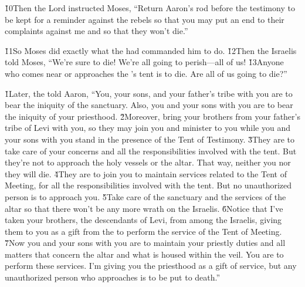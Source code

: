 \v{10}Then the Lord instructed Moses, ``Return Aaron's rod before the testimony to be kept for a reminder against the rebels so that you may put an end to their complaints against me and so that they won't die.''

\v{11}So Moses did exactly what the  had commanded him to do. \v{12}Then the Israelis told Moses, ``We're sure to die! We're all going to perish---all of us! \v{13}Anyone who comes near or approaches the 's tent is to die. Are all of us going to die?''

\v{1}Later, the  told Aaron, ``You, your sons, and your father's tribe with you are to bear the iniquity of the sanctuary. Also, you and your sons with you are to bear the iniquity of your priesthood. \v{2}Moreover, bring your brothers from your father's tribe of Levi with you, so they may join you and minister to you while you and your sons with you stand in the presence of the Tent of Testimony. \v{3}They are to take care of your concerns and all the responsibilities involved with the tent. But they're not to approach the holy vessels or the altar. That way, neither you nor they will die. \v{4}They are to join you to maintain services related to the Tent of Meeting, for all the responsibilities involved with the tent. But no unauthorized person is to approach you. \v{5}Take care of the sanctuary and the services of the altar so that there won't be any more wrath on the Israelis. \v{6}Notice that I've taken your brothers, the descendants of Levi, from among the Israelis, giving them to you as a gift from the  to perform the service of the Tent of Meeting. \v{7}Now you and your sons with you are to maintain your priestly duties and all matters that concern the altar and what is housed within the veil. You are to perform these services. I'm giving you the priesthood as a gift of service, but any unauthorized person who approaches is to be put to death.''

